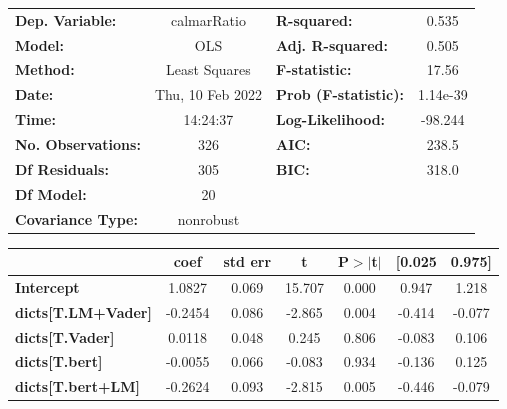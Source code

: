 \begin{center}
\begin{tabular}{lclc}
\toprule
\textbf{Dep. Variable:}              &   calmarRatio    & \textbf{  R-squared:         } &     0.535   \\
\textbf{Model:}                      &       OLS        & \textbf{  Adj. R-squared:    } &     0.505   \\
\textbf{Method:}                     &  Least Squares   & \textbf{  F-statistic:       } &     17.56   \\
\textbf{Date:}                       & Thu, 10 Feb 2022 & \textbf{  Prob (F-statistic):} &  1.14e-39   \\
\textbf{Time:}                       &     14:24:37     & \textbf{  Log-Likelihood:    } &   -98.244   \\
\textbf{No. Observations:}           &         326      & \textbf{  AIC:               } &     238.5   \\
\textbf{Df Residuals:}               &         305      & \textbf{  BIC:               } &     318.0   \\
\textbf{Df Model:}                   &          20      & \textbf{                     } &             \\
\textbf{Covariance Type:}            &    nonrobust     & \textbf{                     } &             \\
\bottomrule
\end{tabular}
\begin{tabular}{lcccccc}
                                     & \textbf{coef} & \textbf{std err} & \textbf{t} & \textbf{P$> |$t$|$} & \textbf{[0.025} & \textbf{0.975]}  \\
\midrule
\textbf{Intercept}                   &       1.0827  &        0.069     &    15.707  &         0.000        &        0.947    &        1.218     \\
\textbf{dicts[T.LM+Vader]}           &      -0.2454  &        0.086     &    -2.865  &         0.004        &       -0.414    &       -0.077     \\
\textbf{dicts[T.Vader]}              &       0.0118  &        0.048     &     0.245  &         0.806        &       -0.083    &        0.106     \\
\textbf{dicts[T.bert]}               &      -0.0055  &        0.066     &    -0.083  &         0.934        &       -0.136    &        0.125     \\
\textbf{dicts[T.bert+LM]}            &      -0.2624  &        0.093     &    -2.815  &         0.005        &       -0.446    &       -0.079     \\

\end{tabular}
\end{center}
